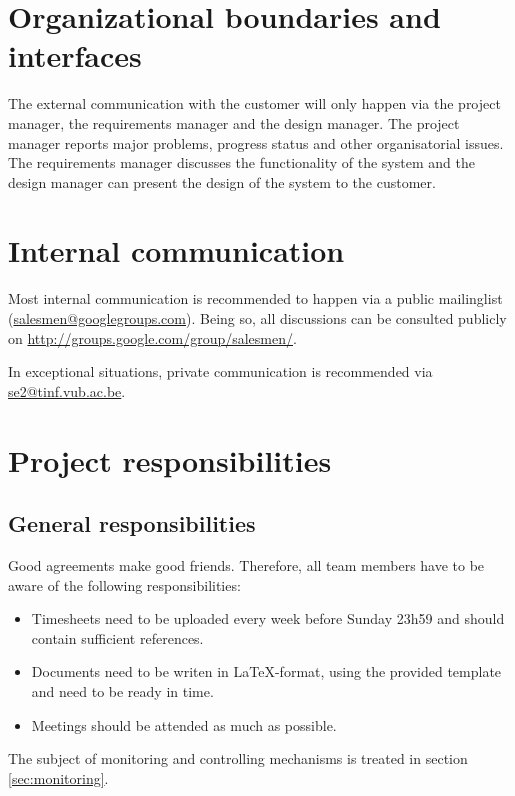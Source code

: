 \documentclass[salesmen, twoside]{../../../templates/latex/2009/softproj}
\begin{document}
\begin{projdoc}
		\section{Organizational boundaries and interfaces}
		
		The external communication with the customer will only happen via the project
		manager, the requirements manager and the design manager. The project manager reports
		major problems, progress status and other organisatorial issues. 
		The requirements manager discusses the functionality of the system and 
		the design manager can present the design of the system to the
		customer.  
		
		\section{Internal communication}
		
		Most internal communication is recommended to happen via a public mailinglist
		(\href{mailto:salesmen@googlegroups.com}{salesmen@googlegroups.com}). 
		Being so, all discussions can be consulted publicly on \url{http://groups.google.com/group/salesmen/}.

		In exceptional situations, private communication is recommended via 
		\href{mailto:se2@tinf.vub.ac.be}{se2@tinf.vub.ac.be}.
		
		
		\section{Project responsibilities}
		
		\subsection{General responsibilities}
		
		Good agreements make good friends. Therefore, all team members have to be aware of the following responsibilities:
		
		\begin{itemize}
			
			\item Timesheets need to be uploaded every week before Sunday 23h59 and should contain sufficient references.
			\item Documents need to be writen in \LaTeX-format, using the provided template and need to be ready in time.
			\item Meetings should be attended as much as possible.
			
		\end{itemize}
		The subject of monitoring and controlling mechanisms is treated in section \ref{sec:monitoring}.
		

\end{projdoc}
\end{document}
